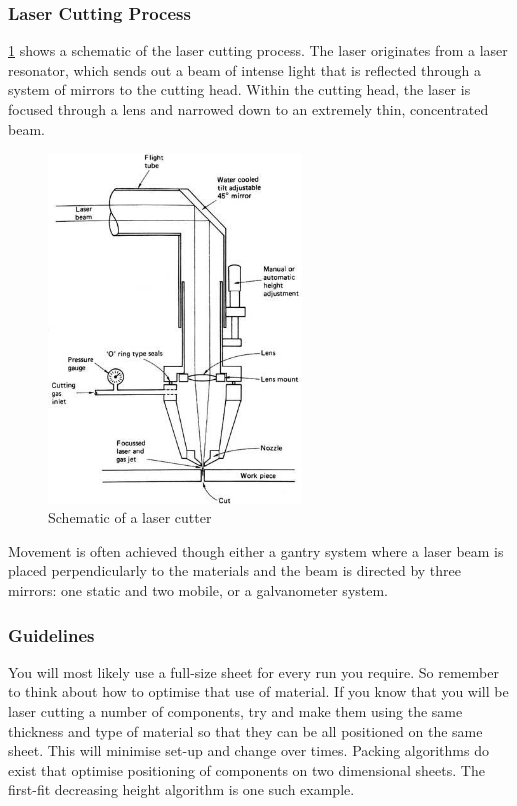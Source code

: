 \subsubsection{Laser Cutting Process}

\cref{fig-cutter} shows a schematic of the laser cutting process. The laser originates from a laser resonator, which sends out a beam of intense light that is reflected through a system of mirrors to the cutting head. Within the cutting head, the laser is focused through a lens and narrowed down to an extremely thin, concentrated beam.

\begin{figure}
  \centering
  \includegraphics[width=0.6\textwidth]{figs/laser-cutter.jpg}
  \caption{Schematic of a laser cutter}\label{fig-cutter}
\end{figure}

Movement is often achieved though either a gantry system where a laser beam is placed perpendicularly to the materials and the beam is directed by three mirrors: one static and two mobile, or a galvanometer system.


\subsubsection{Guidelines}

You will most likely use a full-size sheet for every run you require. So remember to think about how to optimise that use of material. If you know that you will be laser cutting a number of components, try and make them using the same thickness and type of material so that they can be all positioned on the same sheet. This will minimise set-up and change over times. Packing algorithms do exist that optimise positioning of components on two dimensional sheets. The first-fit decreasing height algorithm is one such example.

